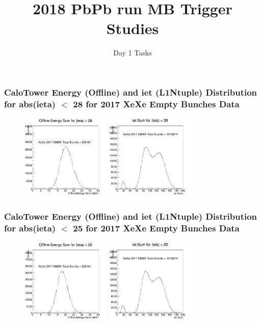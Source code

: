 \documentclass{beamer}
\begin{document}
\title{2018 PbPb run MB Trigger Studies}
\subtitle{Day 1 Tasks}

\begin{frame}
\frametitle{CaloTower Energy (Offline) and iet (L1Ntuple) Distribution for abs(ieta) $<$ 28 for 2017 XeXe Empty Bunches Data} 


\begin{figure}
\includegraphics[width=0.38\textwidth]{Plots/XeXe/EnergySumHis28.png}
\includegraphics[width=0.38\textwidth]{Plots/XeXe/iETSumHisLT28.png}
\end{figure}

\end{frame}

\begin{frame}
\frametitle{CaloTower Energy (Offline) and iet (L1Ntuple) Distribution for abs(ieta) $<$ 25 for 2017 XeXe Empty Bunches Data}

\begin{figure}
\includegraphics[width=0.38\textwidth]{Plots/XeXe/EnergySumHis25.png}
\includegraphics[width=0.38\textwidth]{Plots/XeXe/iETSumHisLT25.png}
\end{figure}
\end{frame}
\end{document}
